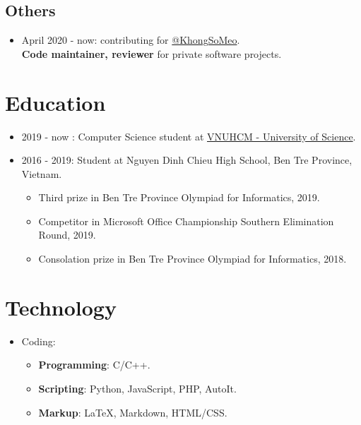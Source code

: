 \documentclass{article}
\begin{document}
\subsection{Others}
\begin{itemize}
\item April 2020 - now: contributing for \href{https://github.com/khongsomeo}{@KhongSoMeo}.\\
\textbf{Code maintainer, reviewer} for private software projects.
\end{itemize}

\section{Education}
\begin{itemize}
\item 2019 - now : Computer Science student at \href{https://en.hcmus.edu.vn}{VNUHCM - University of Science}.
\item 2016 - 2019: Student at Nguyen Dinh Chieu High School, Ben Tre Province, Vietnam.
\begin{itemize}
\item Third prize in Ben Tre Province Olympiad for Informatics, 2019.
\item Competitor in Microsoft Office Championship Southern Elimination Round, 2019.
\item Consolation prize in Ben Tre Province Olympiad for Informatics, 2018.
\end{itemize}
\end{itemize}

\section{Technology}
\begin{itemize}
\item Coding:
\begin{itemize}
\item \textbf{Programming}: C/C++.
\item \textbf{Scripting}: Python, JavaScript, PHP, AutoIt.
\item \textbf{Markup}: \LaTeX, Markdown, HTML/CSS.
\end{itemize}
\end{itemize}
\end{document}
